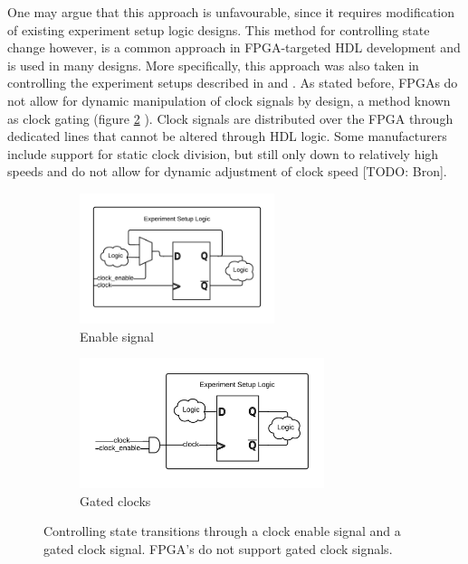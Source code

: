 \documentclass[openright]{uva-bachelor-thesis}
\begin{document}
One may argue that this approach is unfavourable, since it requires modification of existing experiment setup logic designs. This method for controlling state change however, is a common approach in FPGA-targeted HDL development and is used in many designs. More specifically, this approach was also taken in controlling the experiment setups described in \cite{holland2003harnessing} and \cite{bulic2013fpga}. As stated before, FPGAs do not allow for dynamic manipulation of clock signals by design, a method known as clock gating (figure \ref{fig:clock-manipulation-gated} ). Clock signals are distributed over the FPGA through dedicated lines that cannot be altered through HDL logic. Some manufacturers include support for static clock division, but still only down to relatively high speeds and do not allow for dynamic adjustment of clock speed [TODO: Bron]. 


\begin{figure}[h]
    \centering
    \begin{subfigure}[t]{0.5\textwidth}
        \centering
        \includegraphics[height=1.5in]{clock-manipulation-enable}
        \caption{Enable signal}
        \label{fig:clock-manipulation-enable}
    \end{subfigure}%
    \begin{subfigure}[t]{0.5\textwidth}
        \centering
        \includegraphics[height=1.5in]{clock-manipulation-gated}
        \caption{Gated clocks}
        \label{fig:clock-manipulation-gated}
    \end{subfigure}
    \caption{Controlling state transitions through a clock enable signal and a gated clock signal. FPGA's do not support gated clock signals.}
    \label{fig:clock-manipulation}
\end{figure}
\end{document}
